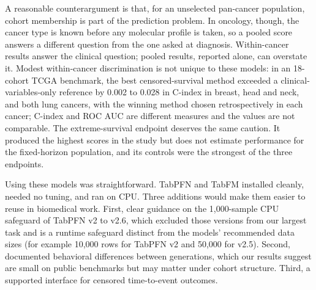 A reasonable counterargument is that, for an unselected pan-cancer population, cohort membership is part of the prediction problem. In oncology, though, the cancer type is known before any molecular profile is taken, so a pooled score answers a different question from the one asked at diagnosis. Within-cancer results answer the clinical question; pooled results, reported alone, can overstate it. Modest within-cancer discrimination is not unique to these models: in an 18-cohort TCGA benchmark, the best censored-survival method exceeded a clinical-variables-only reference by 0.002 to 0.028 in C-index in breast, head and neck, and both lung cancers, with the winning method chosen retrospectively in each cancer; C-index and ROC AUC are different measures and the values are not comparable.\citep{herrmann2021benchmark} The extreme-survival endpoint deserves the same caution. It produced the highest scores in the study but does not estimate performance for the fixed-horizon population, and its controls were the strongest of the three endpoints.

Using these models was straightforward. TabPFN and TabFM installed cleanly, needed no tuning, and ran on CPU. Three additions would make them easier to reuse in biomedical work. First, clear guidance on the 1,000-sample CPU safeguard of TabPFN v2 to v2.6, which excluded those versions from our largest task and is a runtime safeguard distinct from the models' recommended data sizes (for example 10,000 rows for TabPFN v2 and 50,000 for v2.5).\citep{hollmann2025accurate,priorlabs2025tabpfn25} Second, documented behavioral differences between generations, which our results suggest are small on public benchmarks but may matter under cohort structure. Third, a supported interface for censored time-to-event outcomes.

